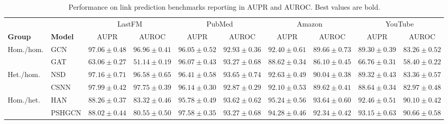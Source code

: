 \begin{table}[t]
  \centering
  \caption{Performance on link prediction benchmarks reporting in AUPR and AUROC. Best values are bold.}
  \label{tab:link-pred}
  \scriptsize
  \setlength{\tabcolsep}{2.5pt}
  \resizebox{0.8\textwidth}{!}
  {%
  \begin{tabular}{llcccccccc}
    \toprule
    & & \multicolumn{2}{c}{LastFM} & \multicolumn{2}{c}{PubMed} & \multicolumn{2}{c}{Amazon} & \multicolumn{2}{c}{YouTube} \\
    \cmidrule(lr){3-4}\cmidrule(lr){5-6}\cmidrule(lr){7-8}\cmidrule(lr){9-10}
    \textbf{Group} & \textbf{Model} & AUPR & AUROC & AUPR & AUROC & AUPR & AUROC & AUPR & AUROC \\
    \midrule

    \multirow{2}{*}{Hom./hom.}
    & GCN
    & $97.06 \pm 0.48$ & $96.96 \pm 0.41$
    & $96.05 \pm 0.52$ & $92.93 \pm 0.36$
    & $92.40 \pm 0.61$ & $89.66 \pm 0.73$
    & $89.30 \pm 0.39$ & $83.26 \pm 0.52$ \\
    & GAT
    & $63.06 \pm 0.27$ & $51.14 \pm 0.19$
    & $96.07 \pm 0.43$ & $93.27 \pm 0.68$
    & $88.62 \pm 0.34$ & $86.10 \pm 0.45$
    & $66.76 \pm 0.31$ & $58.40 \pm 0.22$ \\
    \midrule

    \multirow{2}{*}{Het./hom.}
    & NSD
    & $97.16 \pm 0.71$ & $96.58 \pm 0.65$
    & $96.41 \pm 0.58$ & $93.65 \pm 0.74$
    & $92.63 \pm 0.49$ & $90.04 \pm 0.38$
    & $89.32 \pm 0.43$ & $83.36 \pm 0.57$ \\
    & CSNN
    & $97.99 \pm 0.42$ & $97.75 \pm 0.39$
    & $96.14 \pm 0.30$ & $92.87 \pm 0.29$
    & $92.10 \pm 0.53$ & $89.62 \pm 0.41$
    & $88.64 \pm 0.34$ & $82.97 \pm 0.48$ \\
    \midrule

    \multirow{2}{*}{Hom./het.}
    & HAN
    & $88.26 \pm 0.37$ & $83.32 \pm 0.46$
    & $95.78 \pm 0.49$ & $93.62 \pm 0.62$
    & $95.24 \pm 0.56$ & $93.64 \pm 0.60$
    & $92.46 \pm 0.51$ & $90.10 \pm 0.42$ \\
    & PSHGCN
    & $88.02 \pm 0.44$ & $80.55 \pm 0.50$
    & $97.58 \pm 0.35$ & $93.27 \pm 0.68$
    & $94.28 \pm 0.46$ & $92.34 \pm 0.42$
    & $93.15 \pm 0.63$ & $90.66 \pm 0.58$ \\
    \midrule


\end{tabular}}
\end{table}

